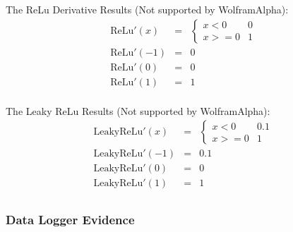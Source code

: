 \begin{center}
    The ReLu Derivative Results (Not supported by WolframAlpha): \\
    \begin{eqnarray*}
        \text{ReLu}'(x) &=&  \begin{cases}
            x < 0 & 0 \\
            x >= 0 & 1
        \end{cases} \\
        \text{ReLu}'(-1) &=& 0 \\
        \text{ReLu}'(0) &=&  0 \\
        \text{ReLu}'(1) &=&  1 \\
    \end{eqnarray*}

    The Leaky ReLu Results (Not supported by WolframAlpha): \\
    \begin{eqnarray*}
        \text{LeakyReLu}'(x) &=&  \begin{cases}
            x < 0 & 0.1 \\
            x >= 0 & 1
        \end{cases} \\
        \text{LeakyReLu}'(-1) &=& 0.1 \\
        \text{LeakyReLu}'(0) &=& 0 \\
        \text{LeakyReLu}'(1) &=& 1 \\
    \end{eqnarray*}


\end{center}

\subsubsection{Data Logger Evidence}

